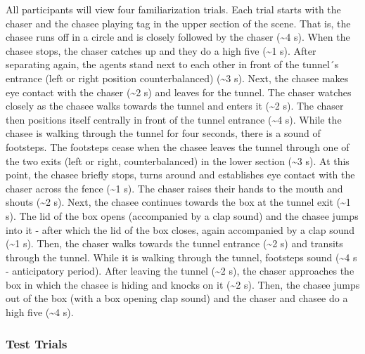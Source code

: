 \documentclass[
  man, donotrepeattitle,floatsintext]{apa6}
\begin{document}
All participants will view four familiarization trials. Each trial starts with the chaser and the chasee playing tag in the upper section of the scene. That is, the chasee runs off in a circle and is closely followed by the chaser (\textasciitilde4 s). When the chasee stops, the chaser catches up and they do a high five (\textasciitilde1 s). After separating again, the agents stand next to each other in front of the tunnel´s entrance (left or right position counterbalanced) (\textasciitilde3 s). Next, the chasee makes eye contact with the chaser (\textasciitilde2 s) and leaves for the tunnel. The chaser watches closely as the chasee walks towards the tunnel and enters it (\textasciitilde2 s). The chaser then positions itself centrally in front of the tunnel entrance (\textasciitilde4 s). While the chasee is walking through the tunnel for four seconds, there is a sound of footsteps. The footsteps cease when the chasee leaves the tunnel through one of the two exits (left or right, counterbalanced) in the lower section (\textasciitilde3 s). At this point, the chasee briefly stops, turns around and establishes eye contact with the chaser across the fence (\textasciitilde1 s). The chaser raises their hands to the mouth and shouts (\textasciitilde2 s). Next, the chasee continues towards the box at the tunnel exit (\textasciitilde1 s). The lid of the box opens (accompanied by a clap sound) and the chasee jumps into it - after which the lid of the box closes, again accompanied by a clap sound (\textasciitilde1 s). Then, the chaser walks towards the tunnel entrance (\textasciitilde2 s) and transits through the tunnel. While it is walking through the tunnel, footsteps sound (\textasciitilde4 s - anticipatory period). After leaving the tunnel (\textasciitilde2 s), the chaser approaches the box in which the chasee is hiding and knocks on it (\textasciitilde2 s). Then, the chasee jumps out of the box (with a box opening clap sound) and the chaser and chasee do a high five (\textasciitilde4 s).

\subsubsection{Test Trials}\label{test-trials}
\end{document}
